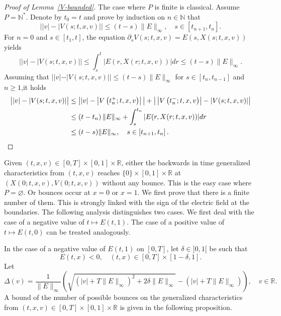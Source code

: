 \documentclass[AHL,Unicode,longabstracts,published]{cedram}
\newcommand{\R}{\mathbb{R}}
\newcommand{\N}{\mathbb{N}}
\begin{document}
\begin{proof}[{Proof of Lemma~\ref{V-bounded}}] The case where $P$ is finite is classical. Assume $P=\N^*$. Denote by $t_0=t$ and prove by induction on $n
\in \N$ that
\begin{equation}\label{property-lemma-V-bounded}
\big | |v|-|V(s;t,x,v)| \big | \leq (t-s) \| E \|_{\infty }, \quad s \in \left[t_{n+1},t_n\right].
\end{equation}
For $n=0$ and $s \in [t_1,t]$, the equation $\partial_s V(s;t,x,v) = E(s,X(s;t,x,v))$ yields
\[
\big| |v| - |V(s;t,x,v)| \big| \leq \int_{s}^t \big|E(r,X(r;t,x,v))\big| dr \leq (t-s) \| E \|_{\infty }.
\]
Assuming that $| |v| - |V(s;t,x,v)| | \leq (t-s) \| E \|_{\infty }$ for $s \in [t_n,t_{n-1}]$ and $n \geq 1$,\linebreak it holds
\begin{align*}
\big| |v| - |V(s;t,x,v)| \big| &\leq \big| |v| - \left|V\left(t_n^+;t,x,v\right)\right|\big| + \big| \left|V\left(t_n^-;t,x,v\right)\right| - |V(s;t,x,v)|\big| \\
&\leq \left(t-t_n\right) \| E \|_{\infty } + \int_s^{t_n} |E(r,X(r;t,x,v))| dr \\
&\leq (t-s) \| E \|_{\infty }, \quad s \in \left[t_{n+1},t_n\right].\qedhere
\end{align*}
\end{proof}

Given $(t,x,v) \in [0,T] \times [0,1] \times \R$, either the backwards in time generalized characteristics from $(t,x,v)$ reaches $\{ 0\} \times [0,1]
\times \R $ at $(X(0;t,x,v),V(0;t,x,v))$ without any bounce. This is the easy case where $P = \varnothing$. Or bounces occur at $x=0$ or $x=1$. We first prove that there is a finite number of them. This is strongly linked with the sign of the electric field at the boundaries. The following analysis distinguishes two cases. We first deal with the case of a negative value of $t \mapsto E(t,1)$. The case of a positive value of $t \mapsto E(t,0)$ can be treated analogously.


In the case of a negative value of $E(t,1)$ on $[0,T]$, let $\delta \in]0,1[$ be such that
\begin{equation}\label{E-bande}
E(t,x)<0, \quad (t,x) \in [0,T] \times [1-\delta, 1].
\end{equation}
Let
\begin{equation}\label{df-Delta(v)}
\Delta(v) = \frac{1}{\|E\|_{\infty }} \left (\sqrt{ \left (|v| + T \| E \|_{\infty } \right)^2 + 2 \delta \|E\|_{\infty } } - \left (|v| + T \| E \|_{\infty } \right) \right), \quad v \in \R.
\end{equation}
A bound of the number of possible bounces on the generalized characteristics from \linebreak
$(t,x,v)\in [0,T] \times [0,1] \times \R$ is given in the following proposition.
\end{document}
